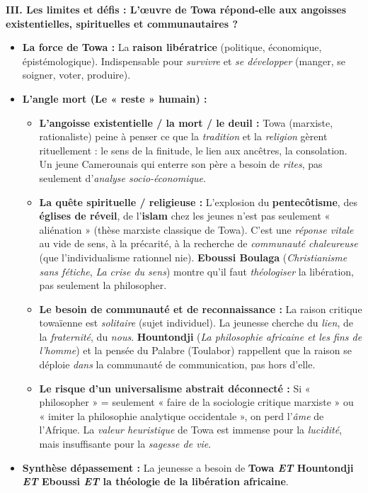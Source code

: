 \documentclass[11pt]{article}
\newcommand{\cle}[1]{{\popxbold\color{popdark}#1}}
\begin{document}
\begin{corrige}
\textbf{III. Les limites et défis : L'œuvre de Towa répond-elle aux angoisses existentielles, spirituelles et communautaires ?}
\begin{itemize}
\item \textbf{La force de Towa :} La \textbf{raison libératrice} (politique, économique, épistémologique). Indispensable pour \emph{survivre} et \emph{se développer} (manger, se soigner, voter, produire).
\item \textbf{L'angle mort (Le « reste » humain) :}
\begin{itemize}
\item \textbf{L'angoisse existentielle / la mort / le deuil :} Towa (marxiste, rationaliste) peine à penser ce que la \emph{tradition} et la \emph{religion} gèrent rituellement : le sens de la finitude, le lien aux ancêtres, la consolation. Un jeune Camerounais qui enterre son père a besoin de \emph{rites}, pas seulement d'\emph{analyse socio-économique}.
\item \textbf{La quête spirituelle / religieuse :} L'explosion du \textbf{pentecôtisme}, des \textbf{églises de réveil}, de l'\textbf{islam} chez les jeunes n'est pas seulement « aliénation » (thèse marxiste classique de Towa). C'est une \emph{réponse vitale} au vide de sens, à la précarité, à la recherche de \emph{communauté chaleureuse} (que l'individualisme rationnel nie). \textbf{Eboussi Boulaga} (\emph{Christianisme sans fétiche}, \emph{La crise du sens}) montre qu'il faut \emph{théologiser} la libération, pas seulement la philosopher.
\item \textbf{Le besoin de \cle{communauté} et de \cle{reconnaissance} :} La \cle{raison critique} towaïenne est \emph{solitaire} (sujet individuel). La jeunesse cherche du \emph{lien}, de la \emph{fraternité}, du \emph{nous}. \textbf{Hountondji} (\emph{La philosophie africaine et les fins de l'homme}) et la pensée du \cle{Palabre} (Toulabor) rappellent que la raison se déploie \emph{dans} la communauté de communication, pas hors d'elle.
\item \textbf{Le risque d'un \cle{universalisme abstrait} déconnecté :} Si « philosopher » = seulement « faire de la sociologie critique marxiste » ou « imiter la philosophie analytique occidentale », on perd l'\emph{âme} de l'Afrique. La \emph{valeur heuristique} de Towa est immense pour la \emph{lucidité}, mais insuffisante pour la \emph{sagesse de vie}.
\end{itemize}
\item \textbf{Synthèse dépassement :} La jeunesse a besoin de \textbf{Towa \emph{ET} Hountondji \emph{ET} Eboussi \emph{ET} la théologie de la libération africaine}.

\end{itemize}
\end{corrige}
\end{document}
